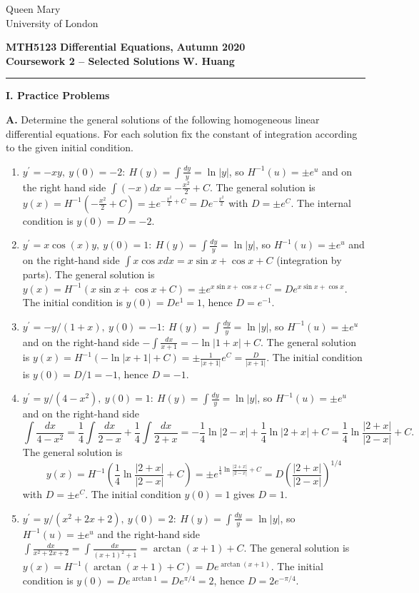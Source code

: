 \documentclass[11pt,a4paper,twoside]{article}
\begin{document}
	\begin{singlespace}
		\begin{center}
			\Huge Queen Mary\\
			\LARGE University of London
		\end{center}
		\Large \textbf{MTH5123} \hfill \Large \textbf{Differential Equations,} \hfill \Large \textbf{Autumn 2020}\\
		\large \textbf{Coursework 2 – Selected Solutions} \hfill \large \textbf{W. Huang}
		\rule{\textwidth}{0.4pt}
	\end{singlespace}
	\textbf{I. Practice Problems}\par
	\textbf{A.} Determine the general solutions of the following homogeneous linear differential equations. For each solution fix the constant of integration according to the given initial condition.
	\begin{enumerate}[\bfseries 1)]
		\item $y^\prime = -xy,\ y(0) = -2:\ H(y) = \int \frac{dy}{y} = \ln |y|$, so $H^{-1}(u)=\pm e^u$ and on the right hand side $\int (-x)dx = -\frac{x^2}{2}+C$. The general solution is $y(x) = H^{-1}\left(-\frac{x^2}{2}+C\right) = \pm e^{-\frac{x^2}{2}+C} = De^{-\frac{x^2}{2}}$ with $D = \pm e^C$. The internal condition is $y(0) = D = -2$.
		\item $y^\prime = x\cos(x)y,\ y(0) = 1:\ H(y)=\int \frac{dy}{y} = \ln|y|$, so $H^{-1}(u) = \pm e^u$ and on the right-hand side $\int x\cos xdx = x\sin x + \cos x + C$ (integration by parts). The general solution is $y(x) = H^{-1}(x\sin x + \cos x + C) = \pm e^{x\sin x + \cos x + C} = De^{x\sin x + \cos x}$. The initial condition is $y(0) = De^1 = 1$, hence $D = e^{-1}$.
		\item $y^\prime = -y/(1+x),\ y(0) = -1:\ H(y) = \int \frac{dy}{y} = \ln|y|$, so $H^{-1}(u)=\pm e^u$ and on the right-hand side $-\int \frac{dx}{x+1} = -\ln|1+x|+C$. The general solution is $y(x) = H^{-1}(-\ln|x+1| + C) = \pm \frac{1}{|x+1|}e^C=\frac{D}{|x+1|}$. The initial condition is $y(0) = D/1 = -1$, hence $D = -1$.
		\item $y^\prime = y/(4-x^2),\ y(0) = 1:\ H(y) = \int \frac{dy}{y} = \ln|y|$, so $H^{-1}(u)=\pm e^u$ and on the right-hand side
		$$
		\int \frac{dx}{4-x^2}
		= \frac{1}{4}\int \frac{dx}{2-x}+\frac{1}{4}\int \frac{dx}{2+x}
		= -\frac{1}{4}\ln|2-x| + \frac{1}{4}\ln|2+x|+C
		= \frac{1}{4}\ln\frac{|2+x|}{|2-x|} + C.
		$$
		The general solution is
		$$
		y(x)
		= H^{-1}\left(\frac{1}{4}\ln \frac{|2+x|}{|2-x|}+C\right)
		= \pm e^{\frac{1}{4}\ln \frac{|2+x|}{|2-x|}+C}
		= D\left(\frac{|2+x|}{|2-x|}\right)^{1/4}
		$$
		with $D = \pm e^C$. The initial condition $y(0) = 1$ gives $D = 1$.
		\item $y^\prime = y/(x^2+2x+2),\ y(0) = 2:\ H(y)=\int \frac{dy}{y} = \ln |y|$, so $H^{-1}(u) = \pm e^u$ and the right-hand side $\int \frac{dx}{x^2+2x+2} = \int \frac{dx}{(x+1)^2+1}=\arctan (x+1) + C$. The general solution is $y(x) = H^{-1}(\arctan (x+1)+C) = De^{\arctan (x+1)}$. The initial condition is $y(0) = De^{\arctan 1} = De^{\pi/4} = 2$, hence $D= 2e^{-\pi/4}$.
	\end{enumerate}
\end{document}
